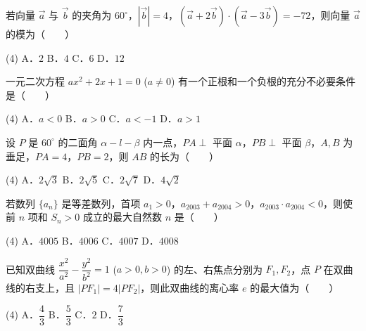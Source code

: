 \begin{question}
若向量 $\vec{a}$ 与 $\vec{b}$ 的夹角为 $60^\circ$，$|\vec{b}| = 4$，$(\vec{a} + 2\vec{b}) \cdot (\vec{a} - 3\vec{b}) = -72$，则向量 $\vec{a}$ 的模为\mbox{（　　）}

\begin{gkopts}(4)
\task A．$2$
\task B．$4$
\task C．$6$
\task D．$12$
\end{gkopts}

\end{question}
\begin{question}
一元二次方程 $ax^2 + 2x + 1 = 0$ ($a \neq 0$) 有一个正根和一个负根的充分不必要条件是\mbox{（　　）}

\begin{gkopts}(4)
\task A．$a < 0$
\task B．$a > 0$
\task C．$a < -1$
\task D．$a > 1$
\end{gkopts}

\end{question}
\begin{question}
设 $P$ 是 $60^\circ$ 的二面角 $\alpha - l - \beta$ 内一点，$PA \perp$ 平面 $\alpha$，$PB \perp$ 平面 $\beta$，$A, B$ 为垂足，$PA = 4$，$PB = 2$，则 $AB$ 的长为\mbox{（　　）}

\begin{gkopts}(4)
\task A．$2\sqrt{3}$
\task B．$2\sqrt{5}$
\task C．$2\sqrt{7}$
\task D．$4\sqrt{2}$
\end{gkopts}

\end{question}
\begin{question}
若数列 $\{a_n\}$ 是等差数列，首项 $a_1 > 0$，$a_{2003} + a_{2004} > 0$，$a_{2003} \cdot a_{2004} < 0$，则使前 $n$ 项和 $S_n > 0$ 成立的最大自然数 $n$ 是\mbox{（　　）}

\begin{gkopts}(4)
\task A．$4005$
\task B．$4006$
\task C．$4007$
\task D．$4008$
\end{gkopts}

\end{question}
\begin{question}
已知双曲线 $\dfrac{x^2}{a^2} - \dfrac{y^2}{b^2} = 1$ ($a > 0, b > 0$) 的左、右焦点分别为 $F_1, F_2$，点 $P$ 在双曲线的右支上，且 $|PF_1| = 4|PF_2|$，则此双曲线的离心率 $e$ 的最大值为\mbox{（　　）}

\begin{gkopts}(4)
\task A．$\dfrac{4}{3}$
\task B．$\dfrac{5}{3}$
\task C．$2$
\task D．$\dfrac{7}{3}$
\end{gkopts}

\end{question}
